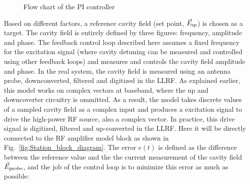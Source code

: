 \documentclass[a4paper,12pt]{article}
\begin{document}
\begin{figure}[H]
\centering

\caption{Flow chart of the PI controller}
\end{figure}

Based on different factors, a reference cavity field (set point, $\vec{E}_{\rm sp}$) is chosen as a target. The cavity field is entirely defined by three figures: frequency, amplitude and phase. The feedback control loop described here assumes a fixed frequency for the excitation signal (where cavity detuning can be measured and controlled using other feedback loops) and measures and controls the cavity field amplitude and phase. In the real system, the cavity field is measured using an antenna probe, downconverted, filtered and digitized in the LLRF. As explained earlier, this model works on complex vectors at baseband, where the up and downcoverter circuitry is ommitted. As a result, the model takes discrete values of a sampled cavity field as a complex input and produces a excitation signal to drive the high-power RF source, also a complex vector. In practice, this drive signal is digitized, filtered and up-converted in the LLRF. Here it will be directly connected to the RF amplifier model block as shown in Fig.~\ref{fig:Station_block_diagram}. The error $e(t)$ is defined as the difference between the reference value and the the current measurement of the cavity field $\vec{E}_{\rm probe}$, and the job of the control loop is to minimize this error as much as possible:
\end{document}
